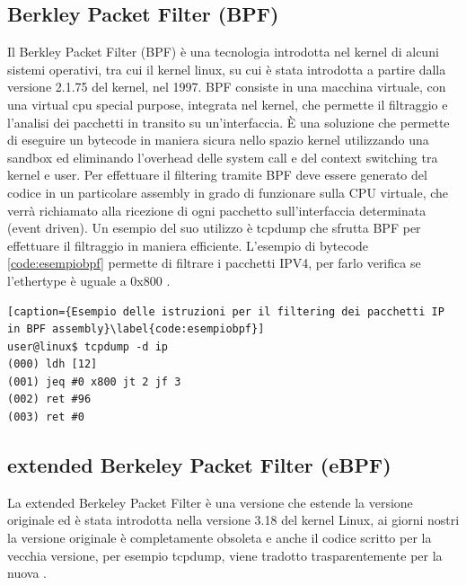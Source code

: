\subsection{Berkley Packet Filter (BPF)}

Il Berkley Packet Filter (BPF) è una tecnologia introdotta nel kernel di alcuni sistemi operativi, tra cui il kernel linux, su cui è stata introdotta a partire dalla versione 2.1.75 del kernel, nel 1997. BPF consiste in una macchina virtuale, con una virtual cpu special purpose, integrata nel kernel, che permette il filtraggio e l'analisi dei pacchetti in transito su un'interfaccia.
È una soluzione che permette di eseguire un bytecode in maniera sicura nello spazio kernel utilizzando una sandbox ed eliminando l'overhead delle system call e del context switching tra kernel e user. 
Per effettuare il filtering tramite BPF deve essere generato del codice in un particolare assembly in grado di funzionare sulla CPU virtuale, che verrà richiamato alla ricezione di ogni pacchetto sull'interfaccia determinata (event driven). 
Un esempio del suo utilizzo è tcpdump che sfrutta BPF per effettuare il filtraggio in maniera efficiente. L'esempio di bytecode \ref{code:esempiobpf} permette di filtrare i pacchetti IPV4, per farlo verifica se l'ethertype è uguale a 0x800 \cite{risso_ebpf}.


\begin{lstlisting}[caption={Esempio delle istruzioni per il filtering dei pacchetti IP in BPF assembly}\label{code:esempiobpf}]
user@linux$ tcpdump -d ip
(000) ldh [12]
(001) jeq #0 x800 jt 2 jf 3
(002) ret #96
(003) ret #0
\end{lstlisting}

\subsection{extended Berkeley Packet Filter (eBPF)}

La extended Berkeley Packet Filter è una versione che estende la versione originale ed è stata introdotta nella versione 3.18 del kernel Linux, ai giorni nostri la versione originale è completamente obsoleta e anche il codice scritto per la vecchia versione, per esempio tcpdump, viene tradotto trasparentemente per la nuova \cite{cilium_ebpf}.

